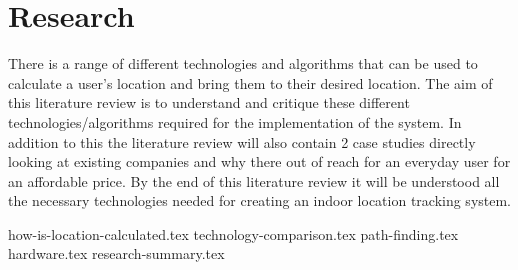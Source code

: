 
\section{Research}
There is a range of different technologies and algorithms that can be used to calculate a user’s location and bring them to their desired location. The aim of this literature review is to understand and critique these different technologies/algorithms required for the implementation of the system. In addition to this the literature review will also contain 2 case studies directly looking at existing companies and why there out of reach for an everyday user for an affordable price. By the end of this literature review it will be understood all the necessary technologies needed for creating an indoor location tracking system. 
		
{how-is-location-calculated.tex}
{technology-comparison.tex}
{path-finding.tex}
{hardware.tex}
{research-summary.tex}
		